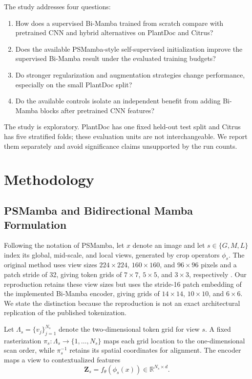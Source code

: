 \documentclass[conference]{IEEEtran}
\begin{document}
The study addresses four questions:
\begin{enumerate}
    \item How does a supervised Bi-Mamba trained from scratch compare with pretrained CNN and hybrid alternatives on PlantDoc and Citrus?
    \item Does the available PSMamba-style self-supervised initialization improve the supervised Bi-Mamba result under the evaluated training budgets?
    \item Do stronger regularization and augmentation strategies change performance, especially on the small PlantDoc split?
    \item Do the available controls isolate an independent benefit from adding Bi-Mamba blocks after pretrained CNN features?
\end{enumerate}

The study is exploratory. PlantDoc has one fixed held-out test split and Citrus has five stratified folds; these evaluation units are not interchangeable. We report them separately and avoid significance claims unsupported by the run counts.

\section{Methodology}
\subsection{PSMamba and Bidirectional Mamba Formulation}
Following the notation of PSMamba, let $x$ denote an image and let $s\in\{G,M,L\}$ index its global, mid-scale, and local views, generated by crop operators $\phi_s$. The original method uses view sizes $224\times224$, $160\times160$, and $96\times96$ pixels and a patch stride of 32, giving token grids of $7\times7$, $5\times5$, and $3\times3$, respectively \cite{almamun2026psmamba}. Our reproduction retains these view sizes but uses the stride-16 patch embedding of the implemented Bi-Mamba encoder, giving grids of $14\times14$, $10\times10$, and $6\times6$. We state the distinction because the reproduction is not an exact architectural replication of the published tokenization.

Let $\Lambda_s=\{v_j\}_{j=1}^{N_s}$ denote the two-dimensional token grid for view $s$. A fixed rasterization $\pi_s:\Lambda_s\rightarrow\{1,\ldots,N_s\}$ maps each grid location to the one-dimensional scan order, while $\pi_s^{-1}$ retains its spatial coordinates for alignment. The encoder maps a view to contextualized features
\begin{equation}
    \mathbf{Z}_s=f_{\theta}(\phi_s(x))\in\mathbb{R}^{N_s\times d}.
    \label{eq:view-tokens}
\end{equation}
\end{document}
